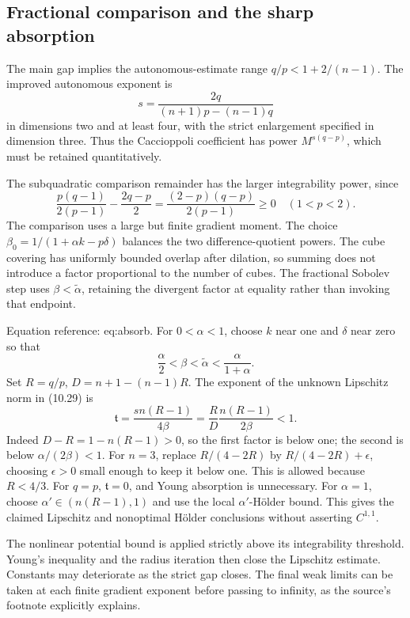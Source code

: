 \documentclass[10pt]{article}
\begin{document}
\subsection*{Fractional comparison and the sharp absorption}
The main gap implies the autonomous-estimate range \(q/p<1+2/(n-1)\). The improved autonomous exponent is \[s=\frac{2q}{(n+1)p-(n-1)q}\] in dimensions two and at least four, with the strict enlargement specified in dimension three. Thus the Caccioppoli coefficient has power \(M^{s(q-p)}\), which must be retained quantitatively.\par
The subquadratic comparison remainder has the larger integrability power, since \[\frac{p(q-1)}{2(p-1)}-\frac{2q-p}{2}
 =\frac{(2-p)(q-p)}{2(p-1)}\geq0
 \quad(1<p<2).\] The comparison uses a large but finite gradient moment. The choice \(\beta_0=1/(1+\alpha k-p\delta)\) balances the two difference-quotient powers. The cube covering has uniformly bounded overlap after dilation, so summing does not introduce a factor proportional to the number of cubes. The fractional Sobolev step uses \(\beta<\widetilde\alpha\), retaining the divergent factor at equality rather than invoking that endpoint.\par
Equation reference: eq:absorb. For \(0<\alpha<1\), choose \(k\) near one and \(\delta\) near zero so that \[\frac{\alpha}{2}<\beta<\widetilde\alpha
 <\frac{\alpha}{1+\alpha}.\] Set \(R=q/p\), \(D=n+1-(n-1)R\). The exponent of the unknown Lipschitz norm in (10.29) is \[
 \mathfrak t=\frac{sn(R-1)}{4\beta}
 =\frac{R}{D}\frac{n(R-1)}{2\beta}<1.\] Indeed \(D-R=1-n(R-1)>0\), so the first factor is below one; the second is below \(\alpha/(2\beta)<1\). For \(n=3\), replace \(R/(4-2R)\) by \(R/(4-2R)+\epsilon\), choosing \(\epsilon>0\) small enough to keep it below one. This is allowed because \(R<4/3\). For \(q=p\), \(\mathfrak t=0\), and Young absorption is unnecessary. For \(\alpha=1\), choose \(\alpha'\in(n(R-1),1)\) and use the local \(\alpha'\)-Hölder bound. This gives the claimed Lipschitz and nonoptimal Hölder conclusions without asserting \(C^{1,1}\).\par
The nonlinear potential bound is applied strictly above its integrability threshold. Young’s inequality and the radius iteration then close the Lipschitz estimate. Constants may deteriorate as the strict gap closes. The final weak limits can be taken at each finite gradient exponent before passing to infinity, as the source’s footnote explicitly explains.\par
\end{document}
